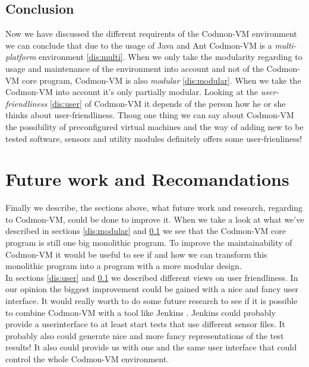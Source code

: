 \documentclass{article}
\newcommand{\project}{Codmon-VM}
\begin{document}
\subsection{Conclusion}
\label{dis:conclusion}
Now we have discussed the different requirents of the \project{} environment we can conclude that due to the usage of Java and Ant \project{} is a \emph{multi-platform} environment \ref{dis:multi}. When we only take the 
modularity regarding to usage and maintenance of the environment into account and not of the \project{} core program, \project{} is also \emph{modular} \ref{dis:modular}. When we take the \project{} into account it's 
only partially modular. Looking at the \emph{user-friendliness} \ref{dis:user} of \project{} it depends of the person how he or she thinks about user-friendliness. Thoug one thing we can say about \project{} 
the possibility of preconfigured virtual machines and the way of adding new to be tested software, sensors and utility modules definitely offers some user-frienliness!


\newpage
\section{Future work and Recomandations}
\label{sec:conclusion}
Finally we describe, the sections above, what future work and research, regarding to \project{}, could be done to improve it. When we take a look at what we've described in sections \ref{dis:modular} and 
\ref{dis:conclusion} we see that the \project{} core program is still one big monolithic program. To improve the maintainability of \project{} it would be useful to see if and how we can transform this monolithic 
program into a program with a more modular design.\\

\noindent In sections \ref{dis:user} and \ref{dis:conclusion} we described different views on user friendliness. In our opinion the biggest improvement could be gained with a nice and fancy user interface. It would 
really worth to do some future research to see if it is possible to combine \project{} with a tool like Jenkins \cite{JenkinsDoc}. Jenkins could probably provide a userinterface to at least start tests that use 
different sensor files. It probably also could generate nice and more fancy representations of the test results! It also could provide us with one and the same user interface that could control the whole \project{} 
environment.  

\newpage

\newpage
\appendix
\end{document}
